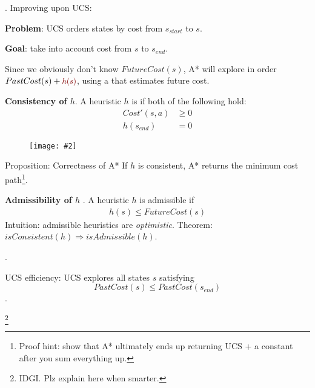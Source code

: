 \documentclass[11pt]{article}
\newcommand\myfig[2][0.3\textwidth]{\begin{figure}[h!]\centering\texttt{[image: \#2]}\end{figure}}
\newcommand\myspace[1][]{\vspace{#1\bigskipamount}\Needspace{10\baselineskip}}
\newcommand\p{\Needspace{10\baselineskip} \noindent}
\begin{document}
\myspace
\p {} . Improving upon UCS:
\begin{compactitem}
	\item \textbf{Problem}: UCS orders states by cost from $s_{start}$ to $s$. 
	\item \textbf{Goal}: take into account cost from $s$ to $s_{end}$. 
\end{compactitem}
Since we obviously don't know $FutureCost(s)$, A* will explore in order $PastCost(s) + \mred{h(s)}$, using a  that estimates future cost. 
\begin{compactitem}
	\item \textbf{Consistency of $h$}. A heuristic $h$ is  if both of the following hold:
	\begin{align}
		Cost'(s, a) &\ge 0 \\
		h(s_{end}) &= 0
	\end{align}
	\myfig[0.3\textwidth]{figs/search2_consistency.png}
	
	\begin{definition}[0em]{Proposition: Correctness of A* }
		If $h$ is consistent, A* returns the minimum cost path\footnote{Proof hint: show that A* ultimately ends up returning UCS + a constant after you sum everything up.}.
	\end{definition}

	
	\item \textbf{Admissibility of $h$} . A heuristic $h$ is admissible if
	\begin{align}
		h(s) \le FutureCost(s)
	\end{align} 
	Intuition: admissible heuristics are \textit{optimistic}. Theorem: $isConsistent(h) \Rightarrow isAdmissible(h)$. 
\end{compactitem}

\myspace 
\p {}.
\begin{compactitem}
	\item UCS efficiency: UCS explores all states $s$ satisfying $$PastCost(s) \le PastCost(s_{end})$$. 
	
	\item {}\footnote{IDGI. Plz explain here when smarter.}
\end{compactitem}
\end{document}
